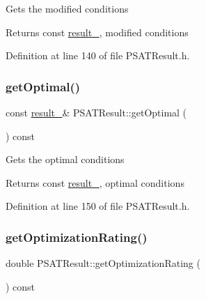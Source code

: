 Gets the modified conditions

\begin{DoxyReturn}{Returns}
const \hyperlink{struct_p_s_a_t_result_1_1result__}{result\+\_\+}, modified conditions 
\end{DoxyReturn}


Definition at line 140 of file P\+S\+A\+T\+Result.\+h.

\mbox{\label{class_p_s_a_t_result_af587235430371a05799c60e81aa8dfad}} 
\subsubsection{\texorpdfstring{get\+Optimal()}{getOptimal()}}
{\footnotesize\ttfamily const \hyperlink{struct_p_s_a_t_result_1_1result__}{result\+\_\+}\& P\+S\+A\+T\+Result\+::get\+Optimal (\begin{DoxyParamCaption}{ }\end{DoxyParamCaption}) const\hspace{0.3cm}{\ttfamily [inline]}}

Gets the optimal conditions

\begin{DoxyReturn}{Returns}
const \hyperlink{struct_p_s_a_t_result_1_1result__}{result\+\_\+}, optimal conditions 
\end{DoxyReturn}


Definition at line 150 of file P\+S\+A\+T\+Result.\+h.

\mbox{\label{class_p_s_a_t_result_aa0a7001461408fcb06a6c22ce2d064db}} 
\subsubsection{\texorpdfstring{get\+Optimization\+Rating()}{getOptimizationRating()}}
{\footnotesize\ttfamily double P\+S\+A\+T\+Result\+::get\+Optimization\+Rating (\begin{DoxyParamCaption}{ }\end{DoxyParamCaption}) const\hspace{0.3cm}{\ttfamily [inline]}}


